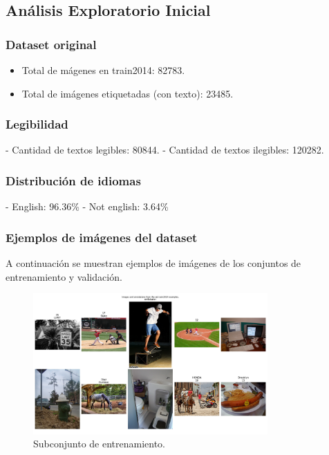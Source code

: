 \documentclass[12pt]{article}
\begin{document}
\subsection{Análisis Exploratorio Inicial}
\subsubsection{Dataset original}
\begin{itemize}
    \item Total de mágenes en train2014: 82783.
    \item Total de imágenes etiquetadas (con texto): 23485.
\end{itemize}
 
\subsubsection{Legibilidad}
- Cantidad de textos legibles: 80844.
- Cantidad de textos ilegibles: 120282.

\subsubsection{Distribución de idiomas}
- English: 96.36\%
- Not english: 3.64\%

\subsubsection{Ejemplos de imágenes del dataset} 
A continuación se muestran ejemplos de imágenes de los conjuntos de entrenamiento y validación.
\newpage
\begin{figure}[ht]
    \centering
    \includegraphics[width=0.8\textwidth]{../reports/figures/visualization_train2014.png} 
    \caption{Subconjunto de entrenamiento.}
    \label{fig:entrenamiento}
\end{figure}
\end{document}

